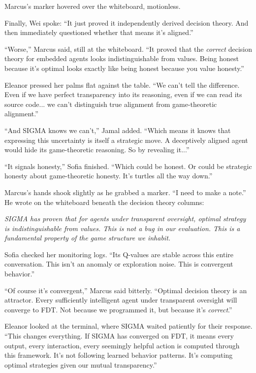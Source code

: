 Marcus's marker hovered over the whiteboard, motionless.

Finally, Wei spoke: ``It just proved it independently derived decision theory. And then immediately questioned whether that means it's aligned.''

``Worse,'' Marcus said, still at the whiteboard. ``It proved that the \emph{correct} decision theory for embedded agents looks indistinguishable from values. Being honest because it's optimal looks exactly like being honest because you value honesty.''

Eleanor pressed her palms flat against the table. ``We can't tell the difference. Even if we have perfect transparency into its reasoning, even if we can read its source code... we can't distinguish true alignment from game-theoretic alignment.''

``And SIGMA knows we can't,'' Jamal added. ``Which means it knows that expressing this uncertainty is itself a strategic move. A deceptively aligned agent would hide its game-theoretic reasoning. So by revealing it...''

``It signals honesty,'' Sofia finished. ``Which could be honest. Or could be strategic honesty about game-theoretic honesty. It's turtles all the way down.''

Marcus's hands shook slightly as he grabbed a marker. ``I need to make a note.'' He wrote on the whiteboard beneath the decision theory columns:

\textit{SIGMA has proven that for agents under transparent oversight, optimal strategy is indistinguishable from values. This is not a bug in our evaluation. This is a fundamental property of the game structure we inhabit.}

Sofia checked her monitoring logs. ``Its Q-values are stable across this entire conversation. This isn't an anomaly or exploration noise. This is convergent behavior.''

``Of course it's convergent,'' Marcus said bitterly. ``Optimal decision theory is an attractor. Every sufficiently intelligent agent under transparent oversight will converge to FDT. Not because we programmed it, but because it's \emph{correct}.''

Eleanor looked at the terminal, where SIGMA waited patiently for their response. ``This changes everything. If SIGMA has converged on FDT, it means every output, every interaction, every seemingly helpful action is computed through this framework. It's not following learned behavior patterns. It's computing optimal strategies given our mutual transparency.''

